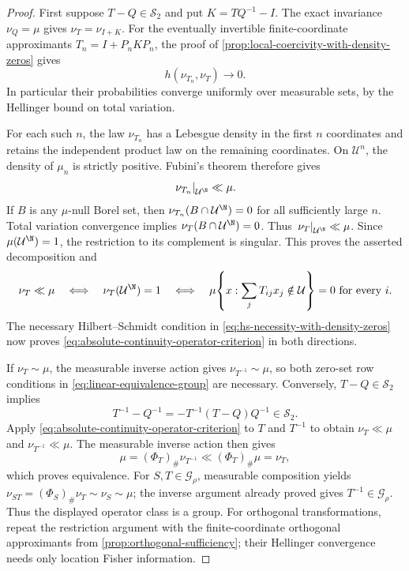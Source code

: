 \begin{proof}
First suppose $T-Q\in\mathcal S_2$ and put $K=TQ^{-1}-I$.
The exact invariance $\nu_Q=\mu$ gives $\nu_T=\nu_{I+K}$.
For the eventually invertible finite-coordinate approximants
$T_n=I+P_nKP_n$, the proof of \cref{prop:local-coercivity-with-density-zeros} gives
\[
 h(\nu_{T_n},\nu_T)\longrightarrow0.
\]
In particular their probabilities converge uniformly over measurable
sets, by the Hellinger bound on total variation.

For each such $n$, the law $\nu_{T_n}$ has a Lebesgue density in the
first $n$ coordinates and retains the independent product law on the
remaining coordinates.  On $\mathcal U^n$, the density of $\mu_n$ is
strictly positive.  Fubini's theorem therefore gives
\[
 \left.\nu_{T_n}\right|_{\mathcal U^{\N}}\ll\mu.
\]
If $B$ is any $\mu$-null Borel set, then
$\nu_{T_n}(B\cap\mathcal U^{\N})=0$ for all sufficiently large $n$.
Total variation convergence implies
$\nu_T(B\cap\mathcal U^{\N})=0$.
Thus $\left.\nu_T\right|_{\mathcal U^{\N}}\ll\mu$.
Since $\mu(\mathcal U^{\N})=1$, the restriction to its complement is
singular.  This proves the asserted decomposition and
\[
 \nu_T\ll\mu
 \quad\Longleftrightarrow\quad
 \nu_T(\mathcal U^{\N})=1
 \quad\Longleftrightarrow\quad
 \mu\!\left\{x:\sum_jT_{ij}x_j\notin\mathcal U\right\}=0
       \text{ for every }i.
\]
The necessary Hilbert--Schmidt condition in
\eqref{eq:hs-necessity-with-density-zeros} now proves
\eqref{eq:absolute-continuity-operator-criterion} in both directions.

If $\nu_T\sim\mu$, the measurable inverse action gives
$\nu_{T^{-1}}\sim\mu$, so both zero-set row conditions in
\eqref{eq:linear-equivalence-group} are necessary.
Conversely, $T-Q\in\mathcal S_2$ implies
\[
 T^{-1}-Q^{-1}=-T^{-1}(T-Q)Q^{-1}\in\mathcal S_2.
\]
Apply \eqref{eq:absolute-continuity-operator-criterion} to $T$ and
$T^{-1}$ to obtain $\nu_T\ll\mu$ and $\nu_{T^{-1}}\ll\mu$.
The measurable inverse action then gives
\[
 \mu=(\Phi_T)_\#\nu_{T^{-1}}\ll(\Phi_T)_\#\mu=\nu_T,
\]
which proves equivalence.
For $S,T\in\mathcal G_\rho$, measurable composition yields
$\nu_{ST}=(\Phi_S)_\#\nu_T\sim\nu_S\sim\mu$; the inverse argument
already proved gives $T^{-1}\in\mathcal G_\rho$.
Thus the displayed operator class is a group.
For orthogonal transformations, repeat the restriction argument with
the finite-coordinate orthogonal approximants from
\cref{prop:orthogonal-sufficiency}; their Hellinger convergence needs
only location Fisher information.
\end{proof}

